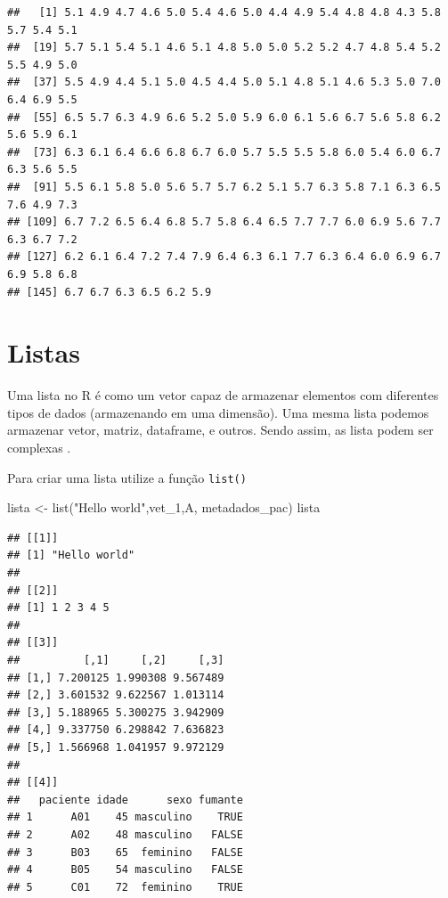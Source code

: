 \documentclass[
]{book}
\newenvironment{Shaded}{\begin{snugshade}}{\end{snugshade}}
\newcommand{\CommentTok}[1]{\textcolor[rgb]{0.56,0.35,0.01}{\textit{#1}}}
\newcommand{\FunctionTok}[1]{\textcolor[rgb]{0.00,0.00,0.00}{#1}}
\newcommand{\NormalTok}[1]{#1}
\newcommand{\OtherTok}[1]{\textcolor[rgb]{0.56,0.35,0.01}{#1}}
\newcommand{\SpecialCharTok}[1]{\textcolor[rgb]{0.00,0.00,0.00}{#1}}
\newcommand{\StringTok}[1]{\textcolor[rgb]{0.31,0.60,0.02}{#1}}
\begin{document}
\begin{Shaded}
\end{Shaded}

\begin{verbatim}
##   [1] 5.1 4.9 4.7 4.6 5.0 5.4 4.6 5.0 4.4 4.9 5.4 4.8 4.8 4.3 5.8 5.7 5.4 5.1
##  [19] 5.7 5.1 5.4 5.1 4.6 5.1 4.8 5.0 5.0 5.2 5.2 4.7 4.8 5.4 5.2 5.5 4.9 5.0
##  [37] 5.5 4.9 4.4 5.1 5.0 4.5 4.4 5.0 5.1 4.8 5.1 4.6 5.3 5.0 7.0 6.4 6.9 5.5
##  [55] 6.5 5.7 6.3 4.9 6.6 5.2 5.0 5.9 6.0 6.1 5.6 6.7 5.6 5.8 6.2 5.6 5.9 6.1
##  [73] 6.3 6.1 6.4 6.6 6.8 6.7 6.0 5.7 5.5 5.5 5.8 6.0 5.4 6.0 6.7 6.3 5.6 5.5
##  [91] 5.5 6.1 5.8 5.0 5.6 5.7 5.7 6.2 5.1 5.7 6.3 5.8 7.1 6.3 6.5 7.6 4.9 7.3
## [109] 6.7 7.2 6.5 6.4 6.8 5.7 5.8 6.4 6.5 7.7 7.7 6.0 6.9 5.6 7.7 6.3 6.7 7.2
## [127] 6.2 6.1 6.4 7.2 7.4 7.9 6.4 6.3 6.1 7.7 6.3 6.4 6.0 6.9 6.7 6.9 5.8 6.8
## [145] 6.7 6.7 6.3 6.5 6.2 5.9
\end{verbatim}

\hypertarget{listas}{%
\section{Listas}\label{listas}}

Uma lista no R é como um vetor capaz de armazenar elementos com diferentes tipos de dados (armazenando em uma dimensão). Uma mesma lista podemos armazenar vetor, matriz, dataframe, e outros. Sendo assim, as lista podem ser complexas .

Para criar uma lista utilize a função \texttt{list()}

\begin{Shaded}
\begin{Highlighting}[]
\NormalTok{lista }\OtherTok{\textless{}{-}} \FunctionTok{list}\NormalTok{(}\StringTok{"Hello world"}\NormalTok{,vet\_1,A, metadados\_pac) }
\NormalTok{lista}
\end{Highlighting}
\end{Shaded}

\begin{verbatim}
## [[1]]
## [1] "Hello world"
## 
## [[2]]
## [1] 1 2 3 4 5
## 
## [[3]]
##          [,1]     [,2]     [,3]
## [1,] 7.200125 1.990308 9.567489
## [2,] 3.601532 9.622567 1.013114
## [3,] 5.188965 5.300275 3.942909
## [4,] 9.337750 6.298842 7.636823
## [5,] 1.566968 1.041957 9.972129
## 
## [[4]]
##   paciente idade      sexo fumante
## 1      A01    45 masculino    TRUE
## 2      A02    48 masculino   FALSE
## 3      B03    65  feminino   FALSE
## 4      B05    54 masculino   FALSE
## 5      C01    72  feminino    TRUE
\end{verbatim}
\end{document}
